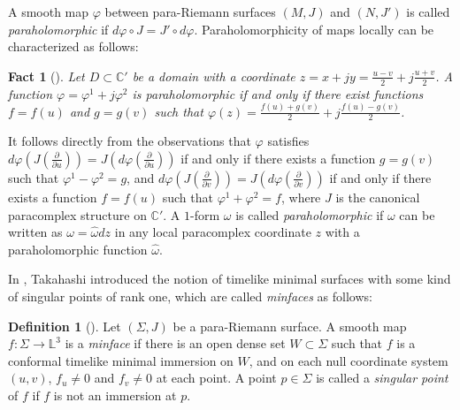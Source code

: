 \documentclass[11pt,reqno]{amsart}
\theoremstyle{plain} %
\newtheorem{fact}[theorem]{Fact}
\theoremstyle{definition}
\newtheorem{definition}[theorem]{Definition}
\begin{document}
A smooth map $\varphi$ between para-Riemann surfaces $(M, J)$ and $(N,J')$ is called {\it paraholomorphic} if $d\varphi \circ J=J'\circ d\varphi$. Paraholomorphicity of maps locally can be characterized as follows:
\begin{fact}[\cite{T}]\label{fact:paraholomorphicity}
Let $D\subset \mathbb{C}'$ be a domain with a coordinate $z=x+jy=\frac{u-v}{2}+j\frac{u+v}{2}$. A function $\varphi=\varphi^1+j\varphi^2$ is paraholomorphic if and only if there exist functions $f=f(u)$ and $g=g(v)$ such that $\varphi(z)=\frac{f(u)+g(v)}{2}+j\frac{f(u)-g(v)}{2}$.
\end{fact} It follows directly from the observations that $\varphi$ satisfies $d\varphi (J(\frac{\partial}{\partial u}))=J(d\varphi(\frac{\partial}{\partial u}))$ if and only if there exists a function $g=g(v)$ such that $\varphi^1-\varphi^2=g$, and $d\varphi (J(\frac{\partial}{\partial v}))=J(d\varphi(\frac{\partial}{\partial v}))$ if and only if there exists a function $f=f(u)$ such that $\varphi^1+\varphi^2=f$, where $J$ is the canonical paracomplex structure on $\mathbb{C}'$. A $1$-form $\omega$ is called {\it paraholomorphic} if $\omega$ can be written as $\omega=\hat{\omega}dz$ in any local paracomplex coordinate $z$ with a paraholomorphic function $\hat{\omega}$.


In \cite{T}, Takahashi introduced the notion of timelike minimal surfaces with some kind of singular points of rank one, which are called {\it minfaces} as follows: 
\begin{definition}[\cite{T}]\label{def:minface}
Let $(\Sigma,J)$ be a para-Riemann surface. A smooth map $f: \Sigma \longrightarrow \mathbb{L}^3$ is a {\it minface} if 
there is an open dense set $W\subset \Sigma$ such that $f$ is a conformal timelike minimal immersion on $W$, and
on each null coordinate system $(u,v)$, $f_u\neq 0$ and $f_v\neq 0$ at each point. A point $p\in \Sigma$ is called a {\it singular point} of $f$ if $f$ is not an immersion at $p$. \end{definition}
\end{document}
